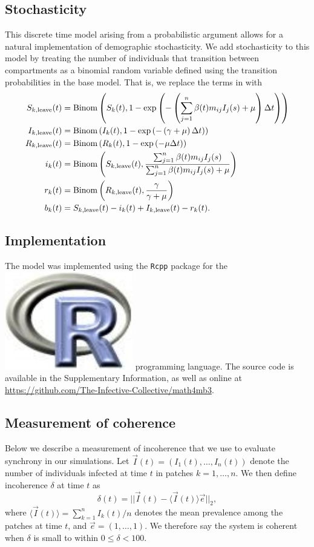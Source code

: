 \documentclass[12pt]{article}
\newcommand{\Rlogo}{\protect\includegraphics[height=2ex,keepaspectratio]{Rlogo.pdf}\xspace}
\begin{document}
\subsection{Stochasticity} \label{ss:stoch_model}
This discrete time model arising from a probabilistic argument allows for a natural implementation of demographic stochasticity. We add stochasticity to this model by treating the number of individuals that transition between compartments as a binomial random variable defined using the transition probabilities in the base model. That is, we replace the terms in  with
\begin{equation}
\label{eq:stochastic}
\begin{aligned}
S_{k, \tiny{\textrm{leave}}}(t) &= \mathrm{Binom}\left(S_k(t), 1 - \exp \left(-\left(\sum_{j=1}^n \beta(t) m_{ij} I_j(s) + \mu \right) \Delta t \right)\right)\\
I_{k, \tiny{\textrm{leave}}}(t) &= \mathrm{Binom}\left(I_k(t), 1 - \exp \left(-\left(\gamma + \mu \right) \Delta t \right)\right)\\
R_{k, \tiny{\textrm{leave}}}(t) &= \mathrm{Binom}\left(R_k(t), 1 - \exp \left(-\mu \Delta t \right)\right)\\
i_k(t) &= \mathrm{Binom}\left(S_{k, \tiny{\textrm{leave}}}(t), \frac{\sum_{j=1}^n \beta(t) m_{ij} I_j(s)}{\sum_{j=1}^n \beta(t) m_{ij} I_j(s) + \mu}\right)\\
r_k(t) &= \mathrm{Binom}\left(R_{k, \tiny{\textrm{leave}}}(t), \frac{\gamma}{\gamma + \mu}\right) \\
b_k(t) &= S_{k, \tiny{\textrm{leave}}}(t) - i_k(t) + I_{k, \tiny{\textrm{leave}}}(t) - r_k(t).
\end{aligned}
\end{equation}

\subsection{Implementation}
The model was implemented using the \texttt{Rcpp} package for the \Rlogo programming language. The source code is available in the Supplementary Information, as well as online at \url{https://github.com/The-Infective-Collective/math4mb3}.  

\subsection{Measurement of coherence}
\label{ss:measurement}
Below we describe a measurement of incoherence that we use to evaluate synchrony in our simulations. 
Let $\vec{I} (t) = (I_1(t), \dots, I_n(t))$ denote the number of individuals infected at time $t$ in patches $k = 1, \dots, n$. We then define incoherence $\delta$ at time $t$ as
$$
\delta(t) = || \vec{I}(t) - \langle \vec{I} (t) \rangle \vec{e}||_2,
$$
where $\langle \vec{I} (t) \rangle = \sum_{k=1}^n I_k(t) / n$ denotes the mean prevalence among the patches at time $t$, and $\vec{e} = (1, \dots, 1)$. We therefore say the system is coherent when $\delta$ is small to within $0 \leq \delta < 100$. 
\end{document}
